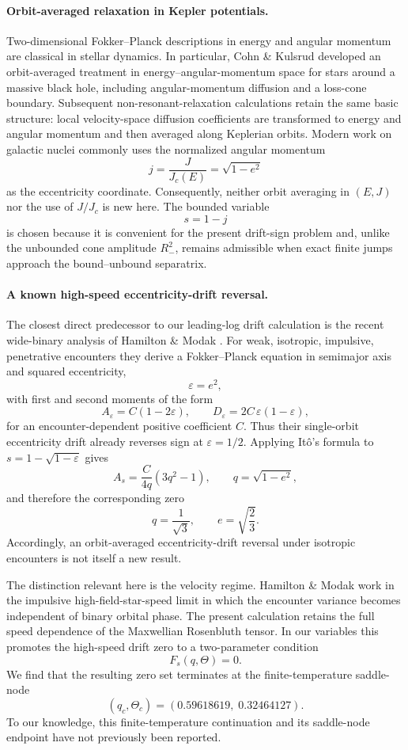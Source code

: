\documentclass[11pt]{article}
\theoremstyle{remark}
\newcommand{\1}{\mathbf 1}
\begin{document}
\paragraph{Orbit-averaged relaxation in Kepler potentials.}
Two-dimensional Fokker--Planck descriptions in energy and angular momentum
are classical in stellar dynamics.  In particular, Cohn \& Kulsrud \cite{CohnKulsrud1978} developed
an orbit-averaged treatment in energy--angular-momentum space for stars around
a massive black hole, including angular-momentum diffusion and a loss-cone
boundary.  Subsequent non-resonant-relaxation calculations retain the same
basic structure: local velocity-space diffusion coefficients are transformed
to energy and angular momentum and then averaged along Keplerian orbits.
Modern work on galactic nuclei commonly uses the normalized angular momentum
\[
j=\frac{J}{J_c(E)}=\sqrt{1-e^2}
\]
as the eccentricity coordinate.  Consequently, neither orbit averaging in
$(E,J)$ nor the use of $J/J_c$ is new here.  The bounded variable
\[
s=1-j
\]
is chosen because it is convenient for the present drift-sign problem and,
unlike the unbounded cone amplitude $R_-^2$, remains admissible when exact
finite jumps approach the bound--unbound separatrix.

\paragraph{A known high-speed eccentricity-drift reversal.}
The closest direct predecessor to our leading-log drift calculation is the
recent wide-binary analysis of Hamilton \& Modak \cite{HamiltonModak2024}.  For weak, isotropic,
impulsive, penetrative encounters they derive a Fokker--Planck equation in
semimajor axis and squared eccentricity,
\[
\varepsilon=e^2,
\]
with first and second moments of the form
\[
A_\varepsilon=C(1-2\varepsilon),
\qquad
D_\varepsilon=2C\,\varepsilon(1-\varepsilon),
\]
for an encounter-dependent positive coefficient $C$.  Thus their
single-orbit eccentricity drift already reverses sign at
$\varepsilon=1/2$.  Applying It\^o's formula to
$s=1-\sqrt{1-\varepsilon}$ gives
\[
A_s
=
\frac{C}{4q}(3q^2-1),
\qquad
q=\sqrt{1-e^2},
\]
and therefore the corresponding zero
\[
q=\frac{1}{\sqrt3},
\qquad
e=\sqrt{\frac23}.
\]
Accordingly, an orbit-averaged eccentricity-drift reversal under isotropic
encounters is not itself a new result.

The distinction relevant here is the velocity regime.  Hamilton \& Modak
work in the impulsive high-field-star-speed limit in which the encounter
variance becomes independent of binary orbital phase.  The present
calculation retains the full speed dependence of the Maxwellian
Rosenbluth tensor.  In our variables this promotes the high-speed drift zero
to a two-parameter condition
\[
F_s(q,\Theta)=0.
\]
We find that the resulting zero set terminates at the finite-temperature
saddle-node
\[
(q_c,\Theta_c)
=
(0.59618619,\;0.32464127).
\]
To our knowledge, this finite-temperature continuation and its saddle-node
endpoint have not previously been reported.
\end{document}
